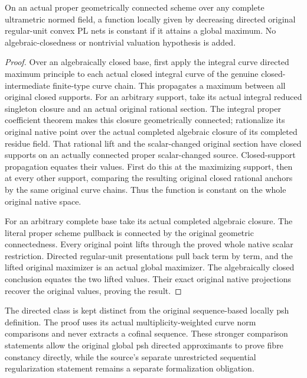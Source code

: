 \begin{theorem}
\label{thm:fc-proper-directed-native-maximum}
\leanok
{}
On an actual proper geometrically connected scheme over any complete
ultrametric normed field, a function locally given by decreasing directed
original regular-unit convex PL nets is constant if it attains a global
maximum. No algebraic-closedness or nontrivial valuation hypothesis is added.
\end{theorem}
\begin{proof}
Over an algebraically closed base, first apply the integral curve directed
maximum principle to each actual closed integral curve of the genuine
closed-intermediate finite-type curve chain. This propagates a maximum between
all original closed supports. For an arbitrary support, take its actual
integral reduced singleton closure and an actual original rational section.
The integral proper coefficient theorem makes this closure geometrically
connected; rationalize its original native point over the actual completed
algebraic closure of its completed residue field. That rational lift and the
scalar-changed original section have closed supports on an actually connected
proper scalar-changed source. Closed-support propagation equates their values.
First do this at the maximizing support, then at every other support, comparing
the resulting original closed rational anchors by the same original curve
chains. Thus the function is constant on the whole original native space.

For an arbitrary complete base take its actual completed algebraic closure.
The literal proper scheme pullback is connected by the original geometric
connectedness. Every original point lifts through the proved whole native
scalar restriction. Directed regular-unit presentations pull back term by
term, and the lifted original maximizer is an actual global maximizer. The
algebraically closed conclusion equates the two lifted values. Their exact
original native projections recover the original values, proving the result.
\end{proof}

\begin{remark}
\label{rmk:fc-directed-maximum-original-class}
The directed class is kept distinct from the original sequence-based locally
psh definition. The proof uses its actual multiplicity-weighted curve norm
comparisons and never extracts a cofinal sequence. These stronger comparison
statements allow the original global psh directed approximants to prove fibre
constancy directly, while the source's separate unrestricted sequential
regularization statement remains a separate formalization obligation.
\end{remark}
